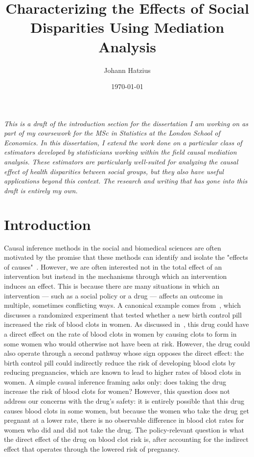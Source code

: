 \documentclass[11pt]{article} %
\title{Characterizing the Effects of Social Disparities Using Mediation Analysis}
\author{Johann Hatzius}
\date{\today}
\numberwithin{equation}{section} %
\begin{document}
\maketitle

\textit{This is a draft of the introduction section for the dissertation I am working on as part of my coursework for the MSc in Statistics at the London School of Economics. In this dissertation, I extend the work done on a particular class of estimators developed by statisticians working within the field causal mediation analysis. These estimators are particularly well-suited for analyzing the causal effect of health disparities between social groups, but they also have useful applications beyond this context. The research and writing that has gone into this draft is entirely my own.}

\section{Introduction}

Causal inference methods in the social and biomedical sciences are often motivated by the promise that these methods can identify and isolate the "effects of causes"~\citep{holland1986}. However, we are often interested not in the total effect of an intervention but instead in the mechanisms through which an intervention induces an effect. This is because there are many situations in which an intervention --- such as a social policy or a drug --- affects an outcome in multiple, sometimes conflicting ways. A canonical example comes from~\cite{hesslow1976}, which discusses a randomized experiment that tested whether a new birth control pill increased the risk of blood clots in women. As discussed in~\cite{pearl2001}, this drug could have a direct effect on the rate of blood clots in women by causing clots to form in some women who would otherwise not have been at risk. However, the drug could also operate through a second pathway whose sign opposes the direct effect: the birth control pill could indirectly reduce the risk of developing blood clots by reducing pregnancies, which are known to lead to higher rates of blood clots in women. A simple causal inference framing asks only: does taking the drug increase the risk of blood clots for women? However, this question does not address our concerns with the drug's safety: it is entirely possible that this drug causes blood clots in some women, but because the women who take the drug get pregnant at a lower rate, there is no observable difference in blood clot rates for women who did and did not take the drug. The policy-relevant question is what the direct effect of the drug on blood clot risk is, after accounting for the indirect effect that operates through the lowered risk of pregnancy. 
\end{document}
